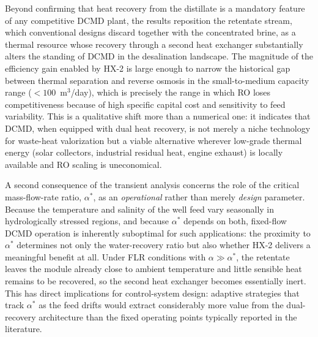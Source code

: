 \documentclass[14pt,letterpaper,fleqn]{extarticle}
\begin{document}
Beyond confirming that heat recovery from the distillate is a mandatory feature
of any competitive DCMD plant, the results reposition the retentate stream,
which conventional designs discard together with the concentrated brine, as a
thermal resource whose recovery through a second heat exchanger substantially
alters the standing of DCMD in the desalination landscape. The magnitude of the
efficiency gain enabled by HX-2 is large enough to narrow the historical gap
between thermal separation and reverse osmosis in the small-to-medium capacity
range ($<100$~m$^3$/day), which is precisely the range in which RO loses
competitiveness because of high specific capital cost and sensitivity to feed
variability. This is a qualitative shift more than a numerical one: it indicates
that DCMD, when equipped with dual heat recovery, is not merely a niche
technology for waste-heat valorization but a viable alternative wherever
low-grade thermal energy (solar collectors, industrial residual heat, engine
exhaust) is locally available and RO scaling is uneconomical.

A second consequence of the transient analysis concerns the role of the critical
mass-flow-rate ratio, $\alpha^{*}$, as an \emph{operational} rather than merely
\emph{design} parameter. Because the temperature and salinity of the well feed
vary seasonally in hydrologically stressed regions, and because $\alpha^{*}$
depends on both, fixed-flow DCMD operation is inherently suboptimal for such
applications: the proximity to $\alpha^{*}$ determines not only the
water-recovery ratio but also whether HX-2 delivers a meaningful benefit at all.
Under FLR conditions with $\alpha \gg \alpha^{*}$, the retentate leaves the
module already close to ambient temperature and little sensible heat remains to
be recovered, so the second heat exchanger becomes essentially inert. This has
direct implications for control-system design: adaptive strategies that track
$\alpha^{*}$ as the feed drifts would extract considerably more value from the
dual-recovery architecture than the fixed operating points typically reported in
the literature.
\end{document}
